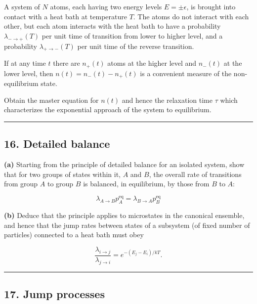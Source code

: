 \documentclass[
  letterpaper,
  enabledeprecatedfontcommands]{report}
\begin{document}
A system of \(N\) atoms, each having two energy levels
\(E = \pm \epsilon\), is brought into contact with a heat bath at
temperature \(T\). The atoms do not interact with each other, but each
atom interacts with the heat bath to have a probability
\(\lambda_{-\to+}(T)\) per unit time of transition from lower to higher
level, and a probability \(\lambda_{+\to-}(T)\) per unit time of the
reverse transition.

If at any time \(t\) there are \(n_+(t)\) atoms at the higher level and
\(n_-(t)\) at the lower level, then \(n(t) = n_-(t) - n_+(t)\) is a
convenient measure of the non-equilibrium state.

Obtain the master equation for \(n(t)\) and hence the relaxation time
\(\tau\) which characterizes the exponential approach of the system to
equilibrium.

\begin{center}\rule{0.5\linewidth}{0.5pt}\end{center}

\subsection*{16. Detailed balance}\label{detailed-balance}

\textbf{(a)} Starting from the principle of detailed balance for an
isolated system, show that for two groups of states within it, \(A\) and
\(B\), the overall rate of transitions from group \(A\) to group \(B\)
is balanced, in equilibrium, by those from \(B\) to \(A\):

\[
\lambda_{A \to B} p^{\text{eq}}_A = \lambda_{B \to A} p^{\text{eq}}_B
\]

\textbf{(b)} Deduce that the principle applies to microstates in the
canonical ensemble, and hence that the jump rates between states of a
subsystem (of fixed number of particles) connected to a heat bath must
obey

\[
\frac{\lambda_{i \to j}}{\lambda_{j \to i}} = e^{-(E_j - E_i)/kT}.
\]

\begin{center}\rule{0.5\linewidth}{0.5pt}\end{center}

\subsection*{17. Jump processes}\label{jump-processes}
\end{document}
